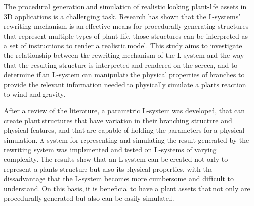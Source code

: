
The procedural generation and simulation of realistic looking plant-life assets in 3D applications is a challenging task. Research has shown that the L-systems' rewriting mechanism is an effective means for procedurally generating structures that represent multiple types of plant-life, those structures can be interpreted as a set of instructions to render a realistic model. This study aims to investigate the relationship between the rewriting mechanism of the L-system and the way that the resulting structure is interpreted and rendered on the screen, and to determine if an L-system can manipulate the physical properties of branches to provide the relevant information needed to physically simulate a plants reaction to wind and gravity. 

After a review of the literature, a parametric L-system was developed, that can create plant structures that have variation in their branching structure and physical features, and that are capable of holding the parameters for a physical simulation. A system for representing and simulating the result generated by the rewriting system was implemented and tested on L-systems of varying complexity. The results show that an L-system can be created not only to represent a plants structure but also its physical properties, with the dissadvantage that the L-system becomes more cumbersome and difficult to understand. On this basis, it is beneficial to have a plant assets that not only are procedurally generated but also can be easily simulated.
